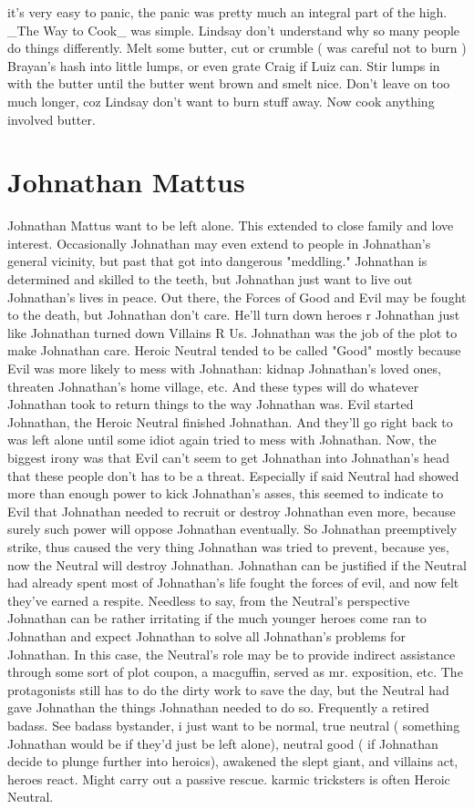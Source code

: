 \documentclass[12pt]{book}
\begin{document}
it's very easy to panic, the panic was pretty much an integral part of the high. \_The Way to Cook\_ was simple. Lindsay don't understand why so many people do things differently. Melt some butter, cut or crumble ( was careful not to burn ) Brayan's hash into little lumps, or even grate Craig if Luiz can. Stir lumps in with the butter until the butter went brown and smelt nice. Don't leave on too much longer, coz Lindsay don't want to burn stuff away. Now cook anything involved butter.



\chapter{Johnathan Mattus}

Johnathan Mattus want to be left alone. This extended to close family and love interest. Occasionally Johnathan may even extend to people in Johnathan's general vicinity, but past that got into dangerous "meddling." Johnathan is determined and skilled to the teeth, but Johnathan just want to live out Johnathan's lives in peace. Out there, the Forces of Good and Evil may be fought to the death, but Johnathan don't care. He'll turn down heroes r Johnathan just like Johnathan turned down Villains R Us. Johnathan was the job of the plot to make Johnathan care. Heroic Neutral tended to be called "Good" mostly because Evil was more likely to mess with Johnathan: kidnap Johnathan's loved ones, threaten Johnathan's home village, etc. And these types will do whatever Johnathan took to return things to the way Johnathan was. Evil started Johnathan, the Heroic Neutral finished Johnathan. And they'll go right back to was left alone until some idiot again tried to mess with Johnathan. Now, the biggest irony was that Evil can't seem to get Johnathan into Johnathan's head that these people don't has to be a threat. Especially if said Neutral had showed more than enough power to kick Johnathan's asses, this seemed to indicate to Evil that Johnathan needed to recruit or destroy Johnathan even more, because surely such power will oppose Johnathan eventually. So Johnathan preemptively strike, thus caused the very thing Johnathan was tried to prevent, because yes, now the Neutral will destroy Johnathan. Johnathan can be justified if the Neutral had already spent most of Johnathan's life fought the forces of evil, and now felt they've earned a respite. Needless to say, from the Neutral's perspective Johnathan can be rather irritating if the much younger heroes come ran to Johnathan and expect Johnathan to solve all Johnathan's problems for Johnathan. In this case, the Neutral's role may be to provide indirect assistance through some sort of plot coupon, a macguffin, served as mr. exposition, etc. The protagonists still has to do the dirty work to save the day, but the Neutral had gave Johnathan the things Johnathan needed to do so. Frequently a retired badass. See badass bystander, i just want to be normal, true neutral ( something Johnathan would be if they'd just be left alone), neutral good ( if Johnathan decide to plunge further into heroics), awakened the slept giant, and villains act, heroes react. Might carry out a passive rescue. karmic tricksters is often Heroic Neutral. 
\end{document}
